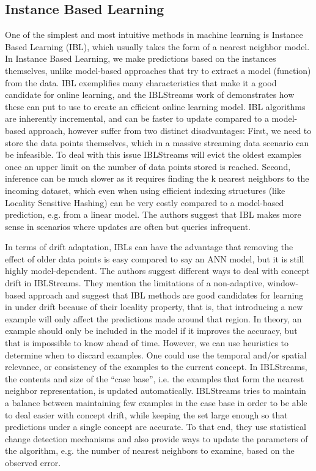 \subsection*{Instance Based Learning}
One of the simplest and most intuitive methods in machine learning
is Instance Based Learning (IBL), which usually takes the form of
a nearest neighbor model.
In Instance Based Learning, we make predictions based on the instances themselves, unlike
model-based approaches that try to extract a model (function) from the
data. IBL exemplifies many characteristics
that make it a good candidate for online learning, and the
IBLStreams work of \citet{ibl-streams} demonstrates how these
can put to use to create an efficient online learning model.
IBL algorithms are inherently incremental, and can be faster to
update compared to a model-based approach, however suffer from two
distinct disadvantages: First, we need to store the data points themselves, which in a
massive streaming data scenario can be infeasible. To deal with this
issue IBLStreams will evict the oldest examples once an upper limit on
the number of data points stored is reached. Second, inference can be much slower as it requires
finding the k nearest neighbors to the incoming dataset, which even when
using efficient indexing structures (like Locality Sensitive Hashing\cite{lsh-indyk, lsh-gionis}) can be very costly
compared to a model-based prediction, e.g. from a linear model. The
authors suggest that IBL makes more sense in scenarios where updates are
often but queries infrequent.

In terms of drift adaptation, IBLs can have
the advantage that removing the effect of older data points is easy
compared to say an ANN model, but it is still highly model-dependent.
The authors suggest different ways to deal with
concept drift in IBLStreams. They mention the limitations of a non-adaptive, window-based
approach and suggest that IBL methods are good candidates for learning in
under drift because of their locality property, that is, that introducing
a new example will only affect the predictions made around that region.
In theory, an example should only be included in the model if it improves the
accuracy, but that is impossible to know ahead of time. However, we can use heuristics
to determine when to discard examples. One could use the temporal and/or spatial
relevance, or consistency of the examples to the current concept.
In IBLStreams, the contents and size of the ``case base'',
i.e. the examples that form the nearest neighbor representation, is
updated automatically. IBLStreams tries to maintain a balance between
maintaining few examples in the case base in order to be able to deal
easier with concept drift, while keeping the set large enough so that
predictions under a single concept are accurate. To that end, they
use statistical change detection mechanisms and also provide ways
to update the parameters of the algorithm, e.g. the number of nearest
neighbors to examine, based on the observed error.

